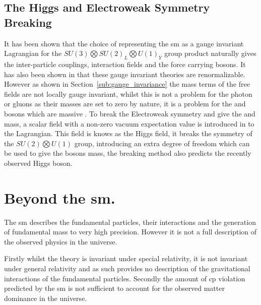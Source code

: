 \subsection{The Higgs and Electroweak Symmetry Breaking} %
\label{sub:the_higgs_and_electro_weak_symmetry_breaking}
It has been shown that the choice of representing the \ac{sm} as a gauge 
invariant Lagrangian for the $SU(3)\bigotimes SU(2)_{L} \bigotimes U(1)_{Y}$ 
group product naturally gives the inter-particle couplings, interaction fields 
and the force carrying bosons. It has also been shown in \cite{Hooft1971167} 
that these gauge invariant theories are renormalizable. However as shown in 
Section~\ref{sub:gauge_invariance} the mass terms of the free fields are not 
locally gauge invariant, whilst this is not a problem for the photon or gluons 
as their masses are set to zero by nature, it is a problem for the \PW and \PZ 
bosons which are massive \cite{Arnison1983103,Aarnio1989539}. To break the 
Electroweak symmetry and give the \PW and \PZ mass, a scalar field with a 
non-zero vacuum expectation value is introduced in to the 
Lagrangian\cite{Higgs:1966cl,Higgs:1964eu}. This field is knows as the Higgs 
field, it breaks the symmetry of the $SU(2)\bigotimes U(1)$ group, introducing 
an extra degree of freedom which can be used to give the bosons mass, the 
breaking method also predicts the recently observed 
\cite{Chatrchyan201230,Aad20121} Higgs boson.



\section{Beyond the \ac{sm}.} %
\label{sec:beyond_the_standard_mode_}
The \ac{sm} describes the fundamental particles, their 
interactions and the generation of fundamental mass to very high precision. 
 However it is not a full description of the observed physics in the universe.

Firstly whilst the theory is invariant under special relativity, it is not 
invariant under general relativity and as such provides no description of the 
gravitational interactions of the fundamental particles. 
Secondly the amount of \ac{cp} violation predicted by the \ac{sm} is not 
sufficient to account for the observed matter dominance in the universe.


